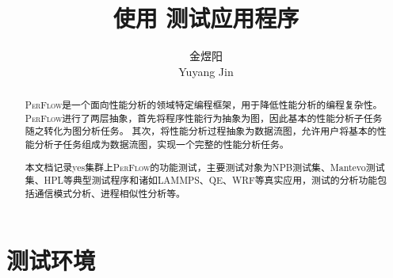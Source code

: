 \documentclass[lang=cn,11pt,a4paper]{elegantpaper}
\title{使用 \perflow{} 测试应用程序}
\author{金煜阳 \\ Yuyang Jin}
\institute{清华大学计算机系 \\ PACMAN实验室}
\date{\zhtoday}
\newcommand{\perflow}{\textsc{PerFlow}\xspace}
\begin{document}
\maketitle

\begin{abstract}
  \perflow{}是一个面向性能分析的领域特定编程框架，用于降低性能分析的编程复杂性。
  \perflow{}进行了两层抽象，首先将程序性能行为抽象为图，因此基本的性能分析子任务随之转化为图分析任务。
  其次，将性能分析过程抽象为数据流图，允许用户将基本的性能分析子任务组成为数据流图，实现一个完整的性能分析任务。
  
  本文档记录yes集群上\perflow{}的功能测试，主要测试对象为NPB测试集、Mantevo测试集、HPL等典型测试程序和诸如LAMMPS、QE、WRF等真实应用，测试的分析功能包括通信模式分析、进程相似性分析等。
\end{abstract}

\section*{测试环境}






\nocite{*}

\end{document}
